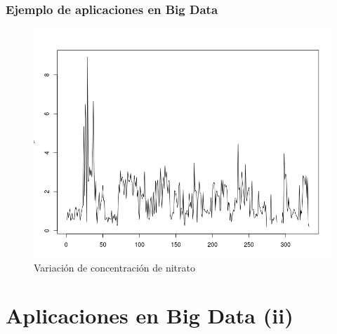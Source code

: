 \documentclass{beamer}
\begin{document}
\begin{frame}
\frametitle{Ejemplo de aplicaciones en Big Data}

\begin{figure}[htb]
\centering
\includegraphics[width=0.50\paperwidth]{nitrate.png}
\caption{Variación de concentración de nitrato}%
\end{figure}

\end{frame}



\section{Aplicaciones en Big Data (ii)}
\end{document}
